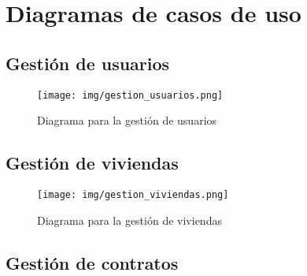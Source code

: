 \chapter{Diagramas de casos de uso}
\section{Gestión de usuarios}

\begin{figure}[!h]
  \centering
    \texttt{[image: img/gestion\_usuarios.png]}
    \caption{Diagrama para la gestión de usuarios}
\end{figure}

\section{Gestión de viviendas}

\begin{figure}[!h]
  \centering
    \texttt{[image: img/gestion\_viviendas.png]}
    \caption{Diagrama para la gestión de viviendas}
\end{figure}

\section{Gestión de contratos}

